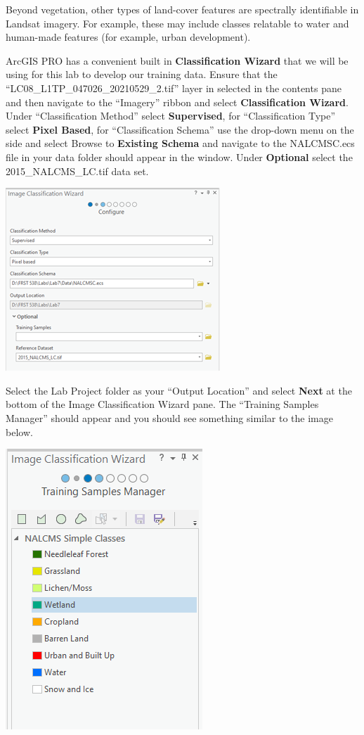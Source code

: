 \documentclass[
]{book}
\begin{document}
Beyond vegetation, other types of land-cover features are spectrally identifiable in Landsat imagery. For example, these may include classes relatable to water and human-made features (for example, urban development).

ArcGIS PRO has a convenient built in \textbf{Classification Wizard} that we will be using for this lab to develop our training data. Ensure that the ``LC08\_L1TP\_047026\_20210529\_2.tif'' layer in selected in the contents pane and then navigate to the ``Imagery'' ribbon and select \textbf{Classification Wizard}. Under ``Classification Method'' select \textbf{Supervised}, for ``Classification Type'' select \textbf{Pixel Based}, for ``Classification Schema'' use the drop-down menu on the side and select Browse to \textbf{Existing Schema} and navigate to the NALCMSC.ecs file in your data folder should appear in the window. Under \textbf{Optional} select the 2015\_NALCMS\_LC.tif data set.

\begin{center}\includegraphics[width=0.5\linewidth]{images/08-image-classification-wizard} \end{center}

Select the Lab Project folder as your ``Output Location'' and select \textbf{Next} at the bottom of the Image Classification Wizard pane. The ``Training Samples Manager'' should appear and you should see something similar to the image below.

\begin{center}\includegraphics[width=0.3\linewidth]{images/08-nalcms-simple-classes} \end{center}
\end{document}
